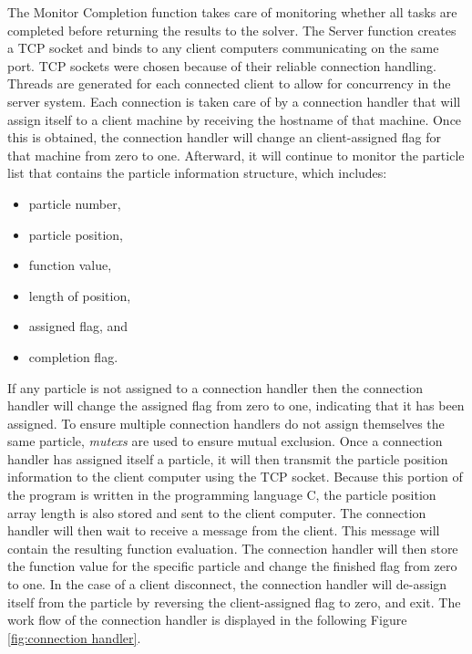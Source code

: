 The Monitor Completion function takes care of monitoring whether all tasks are completed before returning the results to the solver. The Server function creates a TCP socket and binds to any client computers communicating on the same port. TCP sockets were chosen because of their reliable connection handling. Threads are generated for each connected client to allow for concurrency in the server system. Each connection is taken care of by a connection handler that will assign itself to a client machine by receiving the hostname of that machine. Once this is obtained, the connection handler will change an client-assigned flag for that machine from zero to one. Afterward, it will continue to monitor the particle list that contains the particle information structure, which includes: 

\begin{itemize}
    \item particle number,
    \item particle position,
    \item function value,
    \item length of position, 
    \item assigned flag, and
    \item completion flag.
\end{itemize}
If any particle is not assigned to a connection handler then the connection handler will change the assigned flag from zero to one, indicating that it has been assigned. To ensure multiple connection handlers do not assign themselves the same particle, \textit{mutexs} are used to ensure mutual exclusion. Once a connection handler has assigned itself a particle, it will then transmit the particle position information to the client computer using the TCP socket. Because this portion of the program is written in the programming language C, the particle position array length is also stored and sent to the client computer. The connection handler will then wait to receive a message from the client. This message will contain the resulting function evaluation. The connection handler will then store the function value for the specific particle and change the finished flag from zero to one. In the case of a client disconnect, the connection handler will de-assign itself from the particle by reversing the client-assigned flag to zero, and exit. The work flow of the connection handler is displayed in the following Figure \ref{fig:connection handler}.

